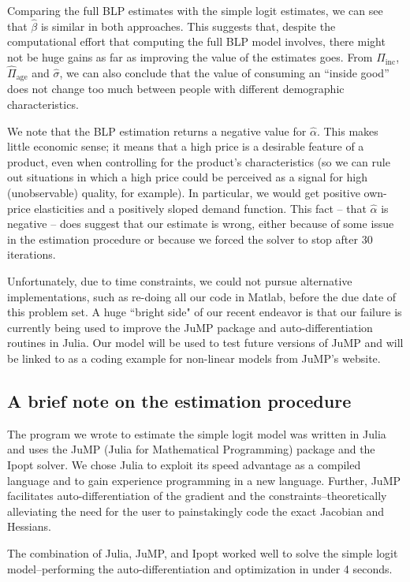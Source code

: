 \documentclass[a4paper,11pt]{article}
\begin{document}
Comparing the full BLP estimates with the simple logit estimates, we can see that $\hat\beta$ is similar in both approaches. This suggests that, despite the computational effort that computing the full BLP model involves, there might not be huge gains as far as improving the value of the estimates goes. From $\hat\Pi_{\mathrm{inc}}$, $\hat\Pi_{\mathrm{age}}$ and $\hat\sigma$, we can also conclude that the value of consuming an ``inside good'' does not change too much between people with different demographic characteristics. 

We note that the BLP estimation returns a negative value for $\hat\alpha$. This makes little economic sense; it means that a high price is a desirable feature of a product, even when controlling for the product's characteristics (so we can rule out situations in which a high price could be perceived as a signal for high (unobservable) quality, for example). In particular, we would get positive own-price elasticities and a positively sloped demand function. This fact -- that $\hat\alpha$ is negative -- does suggest that our estimate is wrong, either because of some issue in the estimation procedure or because we forced the solver to stop after 30 iterations. 

Unfortunately, due to time constraints, we could not pursue alternative implementations, such as re-doing all our code in Matlab, before the due date of this problem set. A huge ``bright side" of our recent endeavor is that our failure is currently being used to improve the JuMP package and auto-differentiation routines in Julia. Our model will be used to test future versions of JuMP and will be linked to as a coding example for non-linear models from JuMP's website.

\subsection*{A brief note on the estimation procedure}
The program we wrote to estimate the simple logit model was written in Julia and uses the JuMP (Julia for Mathematical Programming) package and the Ipopt solver. We chose Julia to exploit its speed advantage as a compiled language and to gain experience programming in a new language. Further, JuMP facilitates auto-differentiation of the gradient and the constraints--theoretically alleviating the need for the user to painstakingly code the exact Jacobian and Hessians.

The combination of Julia, JuMP, and Ipopt worked well to solve the simple logit model--performing the auto-differentiation and optimization in under 4 seconds.
\end{document}
